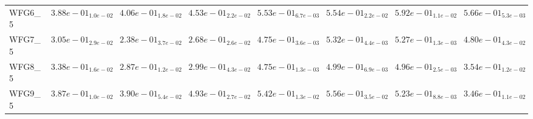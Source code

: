 \documentclass{article}
\begin{document}
\begin{landscape}
\begin{table}
\begin{scriptsize}
\begin{tabular}{llllllll}
WFG6\_5 & $  3.88e-01_{ 1.0e-02}$ & $  4.06e-01_{ 1.8e-02}$ & $  4.53e-01_{ 2.2e-02}$ & $  5.53e-01_{ 6.7e-03}$ & $  5.54e-01_{ 2.2e-02}$ & \cellcolor{gray95}$  5.92e-01_{ 1.1e-02}$ & \cellcolor{gray25}$  5.66e-01_{ 5.3e-03}$ \\
WFG7\_5 & $  3.05e-01_{ 2.9e-02}$ & $  2.38e-01_{ 3.7e-02}$ & $  2.68e-01_{ 2.6e-02}$ & $  4.75e-01_{ 3.6e-03}$ & \cellcolor{gray95}$  5.32e-01_{ 4.4e-03}$ & \cellcolor{gray25}$  5.27e-01_{ 1.3e-03}$ & $  4.80e-01_{ 4.3e-02}$ \\
WFG8\_5 & $  3.38e-01_{ 1.6e-02}$ & $  2.87e-01_{ 1.2e-02}$ & $  2.99e-01_{ 4.3e-02}$ & $  4.75e-01_{ 1.3e-03}$ & \cellcolor{gray95}$  4.99e-01_{ 6.9e-03}$ & \cellcolor{gray25}$  4.96e-01_{ 2.5e-03}$ & $  3.54e-01_{ 1.2e-02}$ \\
WFG9\_5 & $  3.87e-01_{ 1.0e-02}$ & $  3.90e-01_{ 5.4e-02}$ & $  4.93e-01_{ 2.7e-02}$ & \cellcolor{gray25}$  5.42e-01_{ 1.3e-02}$ & \cellcolor{gray95}$  5.56e-01_{ 3.5e-02}$ & $  5.23e-01_{ 8.8e-03}$ & $  3.46e-01_{ 1.1e-02}$ \\
\hline
\end{tabular}
\end{scriptsize}
\end{table}


\end{landscape}
\end{document}
